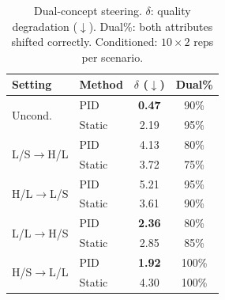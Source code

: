 \documentclass{article}
\theoremstyle{plain}
\begin{document}
\begin{table}[t]
  \caption{Dual-concept steering. $\delta$: quality degradation ($\downarrow$). Dual\%: both attributes shifted correctly. Conditioned: $10{\times}2$ reps per scenario.}
  \label{tab:dual}
  \begin{center}
  \begin{small}
  \begin{tabular}{llcc}
    \toprule
    Setting & Method & $\delta$ ($\downarrow$) & Dual\% \\
    \midrule
    \multirow{2}{*}{Uncond.} & PID & \textbf{0.47} & 90\% \\
    & Static & 2.19 & 95\% \\
    \midrule
    \multirow{2}{*}{L/S$\to$H/L} & PID & 4.13 & 80\% \\
    & Static & 3.72 & 75\% \\
    \multirow{2}{*}{H/L$\to$L/S} & PID & 5.21 & 95\% \\
    & Static & 3.61 & 90\% \\
    \multirow{2}{*}{L/L$\to$H/S} & PID & \textbf{2.36} & 80\% \\
    & Static & 2.85 & 85\% \\
    \multirow{2}{*}{H/S$\to$L/L} & PID & \textbf{1.92} & 100\% \\
    & Static & 4.30 & 100\% \\
    \bottomrule
  \end{tabular}
  \end{small}
  \end{center}
  \vskip -0.1in
\end{table}

\end{document}
